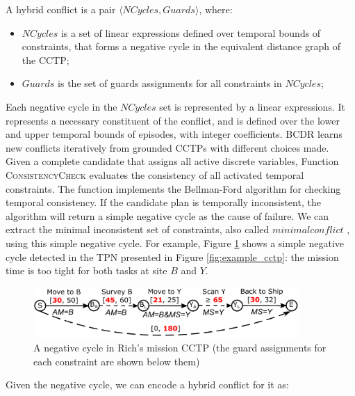 \documentclass[jair,twoside,11pt,theapa]{article}
\begin{document}
\begin{mydef}
	A hybrid conflict is a pair $\langle NCycles,Guards\rangle$, where:
	\begin{itemize}
		\item $NCycles$ is a set of linear expressions defined over temporal bounds of
		constraints, that forms a negative cycle in the equivalent distance graph of the
		CCTP;
		\item $Guards$ is the set of guards assignments for all constraints in $NCycles$;
	\end{itemize}
\end{mydef}


Each negative cycle in the $NCycles$ set is represented by a linear expressions.
It represents a necessary constituent of the conflict, and is defined over the
lower and upper temporal bounds of episodes, with integer coefficients. BCDR
learns new conflicts iteratively from grounded CCTPs with different choices made.
Given a complete candidate that assigns all active discrete variables, Function
\textsc{ConsistencyCheck} evaluates the consistency of all activated temporal
constraints. The function implements the Bellman-Ford algorithm
\cite{bellman1956routing,ford1956network} for checking temporal consistency. If
the candidate plan is temporally inconsistent, the algorithm will return a
simple negative cycle as the cause of failure. We can extract the minimal
inconsistent set of constraints, also called $minimal conflict$
\cite{Liffiton_MUS_2005a}, using this simple negative cycle. For example, Figure
\ref{fig:negative_cycle_consistency} shows a simple negative cycle detected in
the TPN presented in Figure \ref{fig:example_cctp}: the mission time is too
tight for both tasks at site $B$ and $Y$.


\begin{figure}[h!]
	\centering	
	\includegraphics[width=0.9\textwidth]{figures/negative_cycle_consistency.pdf}	
	\caption{A negative cycle in Rich's mission CCTP (the guard assignments for each
		constraint are shown below them)}
	\label{fig:negative_cycle_consistency}
\end{figure}


Given the negative cycle, we can encode a hybrid conflict for it as: \\
\end{document}
